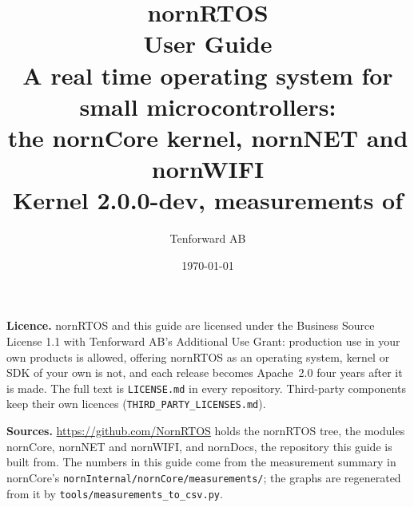 \documentclass[11pt,a4paper,twoside,openany]{report}
\title{\Huge nornRTOS\\[0.4em]\huge User Guide\\[1.5em]
  \large A real time operating system for small microcontrollers:\\
  the nornCore kernel, nornNET and nornWIFI\\[1.5em]
  \normalsize Kernel \code{RTOS\_VERSION} 2.0.0-dev, measurements of \measDate}
\author{Tenforward AB}
\date{\today}
\newcommand{\code}[1]{\texttt{#1}}
\begin{document}
\maketitle
\thispagestyle{empty}

\vspace*{\fill}
\noindent
\begin{minipage}{\linewidth}\small
\textbf{Licence.} nornRTOS and this guide are licensed under the Business Source License 1.1
with Tenforward AB's Additional Use Grant: production use in your own products is allowed,
offering nornRTOS as an operating system, kernel or SDK of your own is not, and each release
becomes Apache~2.0 four years after it is made. The full text is \code{LICENSE.md} in every
repository. Third-party components keep their own licences (\code{THIRD\_PARTY\_LICENSES.md}).

\medskip
\textbf{Sources.} \url{https://github.com/NornRTOS} holds the nornRTOS tree, the modules
nornCore, nornNET and nornWIFI, and nornDocs, the repository this guide is built from. The
numbers in this guide come from the measurement summary \code{\measLabel} in nornCore's
\code{nornInternal/nornCore/measurements/}; the graphs are regenerated from it by
\code{tools/measurements\_to\_csv.py}.
\end{minipage}
\clearpage

\tableofcontents
\clearpage












\appendix




\clearpage
{}
\printindex
\end{document}
